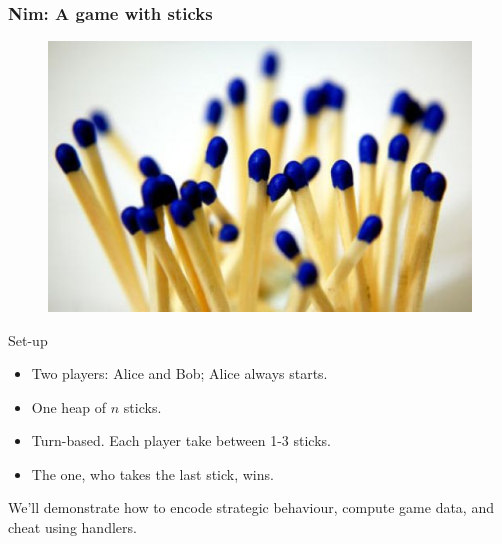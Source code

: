 \begin{frame}
  \frametitle{Nim: A game with sticks}
  \begin{center}
    \begin{figure}
      \includegraphics[scale=0.3]{sticks.jpg}
    \end{figure}
  \end{center}
  Set-up
  \begin{itemize}
    \item Two players: Alice and Bob; Alice always starts.
    \item One heap of $n$ sticks.
    \item Turn-based. Each player take between 1-3 sticks.
    \item The one, who takes the last stick, wins.
  \end{itemize}
We'll demonstrate how to encode strategic behaviour, compute game data, and cheat using handlers.
\end{frame}

